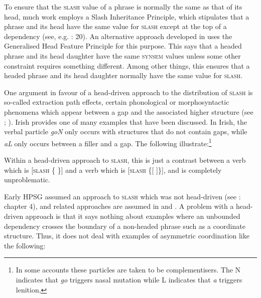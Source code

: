 \documentclass[output=paper
	        ,collection
	        ,collectionchapter
 	        ,biblatex
                ,babelshorthands
                ,newtxmath
                ,draftmode
                ,colorlinks, citecolor=brown
]{langscibook}
\begin{document}
{To ensure that the \textsc{slash} value of a phrase is normally the same as that
of its head, much work employs a Slash Inheritance Principle, which
stipulates that a phrase and its head have the same value for \textsc{slash}
except at the top of a dependency (see, e.g. \citealt{Bouma:Malouf:Sag:01}:
20). An alternative approach developed in \citet[Chapter~5.1]{Ginzburg:Sag:01} uses
the Generalised Head Feature Principle for this purpose. This says that
a headed phrase and its head daughter have the same \textsc{synsem} values unless
some other constraint requires something different. Among other things,
this ensures that a headed phrase and its head daughter normally have
the same value for \textsc{slash}.

One argument in favour of a head-driven approach to the distribution
of \textsc{slash} is so-called extraction path effects, certain phonological or
morphosyntactic phenomena which appear between a gap and the
associated higher structure (see \citealt{hukari.levine:adjunct};
\citealt[Section~3.2]{Bouma:Malouf:Sag:01}). Irish provides one of many
examples that have been discussed. In Irish, the verbal particle
\emph{goN} only occurs with structures that do not contain gaps, while
\emph{aL} only occurs between a filler and a gap. The following
illustrate:\footnote{In some accounts these particles are taken to be
  complementisers. The N indicates that \emph{go} triggers nasal
  mutation while L indicates that \emph{a} triggers lenition,}

\begin{exe} \ex \begin{xlist} \label{ex:UDC:34}

\end{xlist}
\end{exe}

\noindent
Within a head-driven approach to \textsc{slash}, this is just a contrast between a
verb which is {[}\textsc{slash} \{ \}{]} and a verb which is {[}\textsc{slash}
\{{[} {]}\}{]}, and is completely unproblematic.

Early HPSG assumed an approach to \textsc{slash} which was not
head-driven (see \citealt{Pollard:Sag:94}: chapter 4), and related
approaches are assumed in \citet{Levine:Hukari:06} and \citet{Chaves:12}.  A problem
with a head-driven approach is that it says nothing about examples
where an unbounded dependency crosses the boundary of a non-headed
phrase such as a coordinate structure. Thus, it does not deal with
examples of asymmetric coordination like the following:

}
\end{document}
